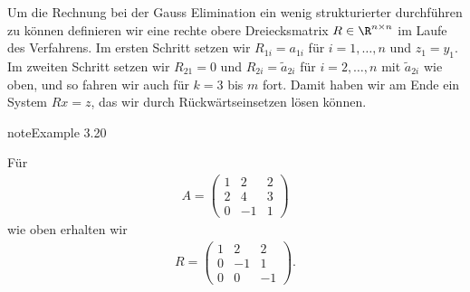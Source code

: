 \documentclass[letterpaper,10pt,english]{jupyterBook}
\begin{document}
Um die Rechnung bei der Gauss Elimination ein wenig strukturierter durchführen zu können definieren wir eine rechte obere Dreiecksmatrix \(R \in \R^{n \times n}\) im Laufe des Verfahrens. Im ersten Schritt setzen wir \(R_{1i}=a_{1i}\) für \(i=1,\ldots,n\) und \(z_1=y_1\). Im zweiten Schritt setzen wir \(R_{21} =0\) und \(R_{2i} = \tilde a_{2i}\) für \(i=2, \ldots,n\) mit \(\tilde a_{2i}\) wie oben, und so fahren wir auch für \(k=3\) bis \(m\) fort. Damit haben wir am Ende ein System \(Rx=z\), das wir durch Rückwärtseinsetzen lösen können.
\label{vektorraeume/LGS:example-21}
\begin{sphinxadmonition}{note}{Example 3.20}



Für
\begin{equation*}
\begin{split} A = \left( \begin{matrix} 1 & 2 & 2 \\ 2 & 4 & 3 \\ 0 & -1 & 1 \end{matrix} \right)\end{split}
\end{equation*}
wie oben erhalten wir
\begin{equation*}
\begin{split} R = \left( \begin{matrix} 1 & 2 & 2 \\ 0 & -1 & 1 \\ 0 & 0 & -1 \end{matrix} \right).\end{split}
\end{equation*}\end{sphinxadmonition}
\end{document}
